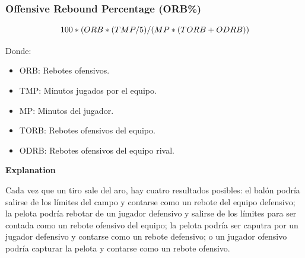 \documentclass[
]{article}
\newenvironment{Shaded}{\begin{snugshade}}{\end{snugshade}}
\newcommand{\DecValTok}[1]{\textcolor[rgb]{0.00,0.00,0.81}{#1}}
\newcommand{\FloatTok}[1]{\textcolor[rgb]{0.00,0.00,0.81}{#1}}
\newcommand{\KeywordTok}[1]{\textcolor[rgb]{0.13,0.29,0.53}{\textbf{#1}}}
\newcommand{\NormalTok}[1]{#1}
\newcommand{\OperatorTok}[1]{\textcolor[rgb]{0.81,0.36,0.00}{\textbf{#1}}}
\newcommand{\StringTok}[1]{\textcolor[rgb]{0.31,0.60,0.02}{#1}}
\providecommand{\tightlist}{%
  \setlength{\itemsep}{0pt}\setlength{\parskip}{0pt}}
\begin{document}
\begin{Shaded}
\end{Shaded}

\hypertarget{offensive-rebound-percentage-orb}{%
\subsubsection{Offensive Rebound Percentage
(ORB\%)}\label{offensive-rebound-percentage-orb}}

\[
  \makebox[\linewidth]{$100*(ORB*(TMP/5)/(MP*(TORB+ODRB))$}
\]

Donde:

\begin{itemize}
\tightlist
\item
  ORB: Rebotes ofensivos.
\item
  TMP: Minutos jugados por el equipo.
\item
  MP: Minutos del jugador.
\item
  TORB: Rebotes ofensivos del equipo.
\item
  ODRB: Rebotes ofensivos del equipo rival.
\end{itemize}

\textbf{Explanation}

Cada vez que un tiro sale del aro, hay cuatro resultados posibles: el
balón podría salirse de los límites del campo y contarse como un rebote
del equipo defensivo; la pelota podría rebotar de un jugador defensivo y
salirse de los límites para ser contada como un rebote ofensivo del
equipo; la pelota podría ser caputra por un jugador defensivo y contarse
como un rebote defensivo; o un jugador ofensivo podría capturar la
pelota y contarse como un rebote ofensivo.
\end{document}
